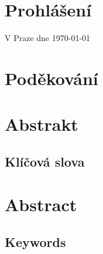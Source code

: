 \section*{Prohlášení}
\noindent
\Prohlaseni

\vspace{2cm}
\noindent
V Praze dne \today
\hspace*{\fill}\small{\AutorPrace}
\vspace{1cm}

\openright
\vspace*{\fill}
\section*{Poděkování}
\noindent
\Podekovani
\vspace{1cm}


\openright
\section*{Abstrakt}
\noindent
\Abstrakt
\subsection*{Klíčová slova}
\noindent
\KlicovaSlova

\vfill

\section*{Abstract}
\noindent
\AbstraktEN
\subsection*{Keywords}
\noindent
\KlicovaSlovaEN

\openright
{}